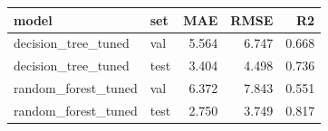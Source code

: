 \begin{tabular}{llrrr}
\toprule
model & set & MAE & RMSE & R2 \\
\midrule
decision_tree_tuned & val & 5.564 & 6.747 & 0.668 \\
decision_tree_tuned & test & 3.404 & 4.498 & 0.736 \\
random_forest_tuned & val & 6.372 & 7.843 & 0.551 \\
random_forest_tuned & test & 2.750 & 3.749 & 0.817 \\
\bottomrule
\end{tabular}
